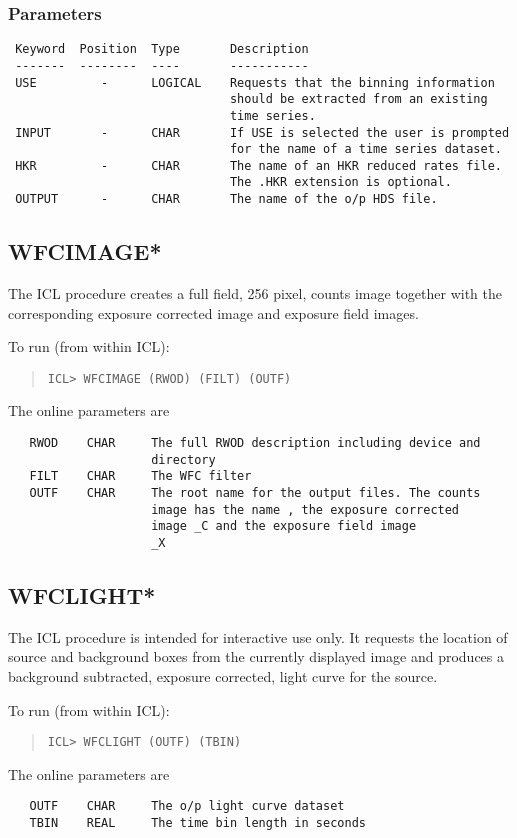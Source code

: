 \documentclass{book}
\renewcommand{\_}{{\tt\char'137}}     %
\begin{document}
\subsubsection{Parameters}
\begin{verbatim}
 Keyword  Position  Type       Description
 -------  --------  ----       -----------
 USE         -      LOGICAL    Requests that the binning information
                               should be extracted from an existing
                               time series.
 INPUT       -      CHAR       If USE is selected the user is prompted
                               for the name of a time series dataset.
 HKR         -      CHAR       The name of an HKR reduced rates file.
                               The .HKR extension is optional.
 OUTPUT      -      CHAR       The name of the o/p HDS file.

\end{verbatim}\subsection{WFCIMAGE*}
The ICL procedure creates a full field, 256 pixel, counts image together
with the corresponding exposure corrected image and exposure field
images.

To run (from within ICL):
\begin{quote}\begin{verbatim}
ICL> WFCIMAGE (RWOD) (FILT) (OUTF)
\end{verbatim}\end{quote}
The online parameters are
\begin{verbatim}
   RWOD    CHAR     The full RWOD description including device and
                    directory
   FILT    CHAR     The WFC filter
   OUTF    CHAR     The root name for the output files. The counts
                    image has the name , the exposure corrected
                    image _C and the exposure field image
                    _X
\end{verbatim}
\subsection{WFCLIGHT*}
The ICL procedure is intended for interactive use only. It requests the
location of source and background boxes from the currently displayed
image and produces a background subtracted, exposure corrected, light
curve for the source.

To run (from within ICL):
\begin{quote}\begin{verbatim}
ICL> WFCLIGHT (OUTF) (TBIN)
\end{verbatim}\end{quote}
The online parameters are
\begin{verbatim}
   OUTF    CHAR     The o/p light curve dataset
   TBIN    REAL     The time bin length in seconds
\end{verbatim}
\end{document}
